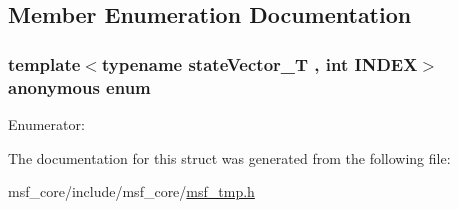 \subsection{Member Enumeration Documentation}
\hypertarget{structmsf__tmp_1_1getStateIndexInState_ad7b69910b085902a0f1649a3c56010d1}{\subsubsection[{anonymous enum}]{\setlength{\rightskip}{0pt plus 5cm}template$<$typename state\-Vector\-\_\-\-T , int I\-N\-D\-E\-X$>$ anonymous enum}}\label{structmsf__tmp_1_1getStateIndexInState_ad7b69910b085902a0f1649a3c56010d1}
\begin{Desc}
\item[Enumerator\-: ]\par
\begin{description}
\item[{\em 
\hypertarget{structmsf__tmp_1_1getStateIndexInState_ad7b69910b085902a0f1649a3c56010d1ada55cb978166c5c7a3b92d656e532efb}{value}\label{structmsf__tmp_1_1getStateIndexInState_ad7b69910b085902a0f1649a3c56010d1ada55cb978166c5c7a3b92d656e532efb}
}]\end{description}
\end{Desc}



The documentation for this struct was generated from the following file\-:\begin{DoxyCompactItemize}
\item 
msf\-\_\-core/include/msf\-\_\-core/\hyperlink{msf__tmp_8h}{msf\-\_\-tmp.\-h}\end{DoxyCompactItemize}
